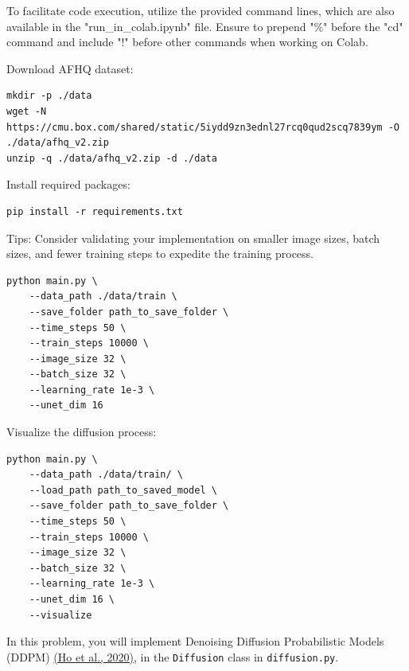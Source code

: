\documentclass[11pt,addpoints,answers]{exam}
\begin{document}
\begin{questions}
To facilitate code execution, utilize the provided command lines, which are also available in the "run\_in\_colab.ipynb" file. Ensure to prepend "\%" before the "cd" command and include "!" before other commands when working on Colab.

\lstset{breaklines=true}
Download AFHQ dataset:

\begin{lstlisting}
mkdir -p ./data
wget -N https://cmu.box.com/shared/static/5iydd9zn3ednl27rcq0qud2scq7839ym -O ./data/afhq_v2.zip
unzip -q ./data/afhq_v2.zip -d ./data
\end{lstlisting}

Install required packages:
\begin{lstlisting}
pip install -r requirements.txt
\end{lstlisting}


Tips: Consider validating your implementation on smaller image sizes, batch sizes, and fewer training steps to expedite the training process.
\begin{lstlisting}
python main.py \
    --data_path ./data/train \
    --save_folder path_to_save_folder \
    --time_steps 50 \
    --train_steps 10000 \
    --image_size 32 \
    --batch_size 32 \
    --learning_rate 1e-3 \
    --unet_dim 16
\end{lstlisting}

Visualize the diffusion process:
\begin{lstlisting}
python main.py \
    --data_path ./data/train/ \
    --load_path path_to_saved_model \
    --save_folder path_to_save_folder \
    --time_steps 50 \
    --train_steps 10000 \
    --image_size 32 \
    --batch_size 32 \
    --learning_rate 1e-3 \
    --unet_dim 16 \
    --visualize
\end{lstlisting}



    In this problem, you will implement Denoising Diffusion Probabilistic Models (DDPM) \href{https://arxiv.org/pdf/2006.11239.pdf}{(Ho et al., 2020)}, in the \lstinline{Diffusion} class in \lstinline{diffusion.py}. 
    

\end{questions}
\end{document}
